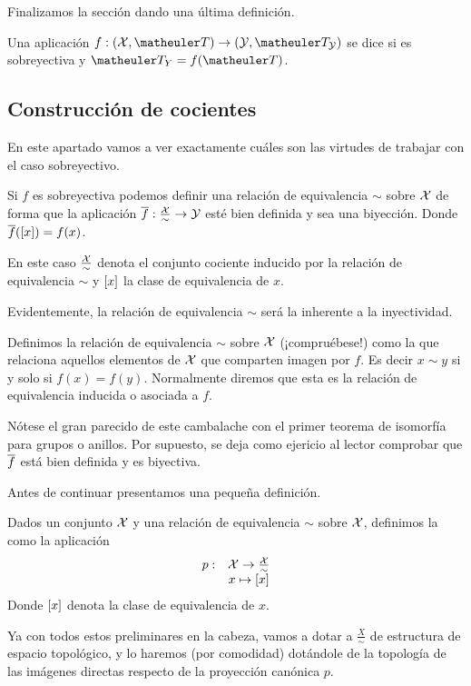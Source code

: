 Finalizamos la sección dando una última definición.
\begin{defi}[Indentificación]
	Una aplicación $f:(\X,\T)\to(\Y,\T_\Y)$ se dice  si es sobreyectiva y $\T_Y=f(\T)$.
\end{defi}
\subsection{Construcción de cocientes}
En este apartado vamos a ver exactamente cuáles son las virtudes de trabajar con el caso sobreyectivo.

Si $f$ es sobreyectiva podemos definir una relación de equivalencia $\sim$ sobre $\mathcal{X}$ de forma que la aplicación $\overline{f}:\frac{\mathcal{X}}{\sim}\to\mathcal{Y}$ esté bien definida y sea una biyección. Donde $\overline{f}(\left [ x \right ])=f(x)$.

En este caso $\frac{\mathcal{X}}{\sim}$ denota el conjunto cociente inducido por la relación de equivalencia $\sim$ y $\left [ x \right ]$ la clase de equivalencia de $x$.

Evidentemente, la relación de equivalencia $\sim$ será la inherente a la inyectividad.
\begin{defi}
	Definimos la relación de equivalencia $\sim$ sobre $\mathcal{X}$ (¡compruébese!) como la que relaciona aquellos elementos de $\mathcal{X}$ que comparten imagen por $f$. Es decir $x\sim y$ si y solo si $f(x)=f(y)$. Normalmente diremos que esta es la relación de equivalencia inducida o asociada a $f$.
\end{defi}
Nótese el gran parecido de este cambalache con el primer teorema de isomorfía para grupos o anillos. Por supuesto, se deja como ejericio al lector comprobar que $\overline{f}$ está bien definida y es biyectiva.

Antes de continuar presentamos una pequeña definición.
\begin{defi}
	Dados un conjunto $\mathcal{X}$ y una relación de equivalencia $\sim$ sobre $\mathcal{X}$, definimos la  como la aplicación
	\[\begin{array}{cc}
	p:&\mathcal{X}\to\frac{\mathcal{X}}{\sim}\\
	&x\mapsto\left [ x \right ]
	\end{array}\]
	Donde $\left [ x \right ]$ denota la clase de equivalencia de $x$.
\end{defi}
Ya con todos estos preliminares en la cabeza, vamos a dotar a $\frac{X}{\sim}$ de estructura de espacio topológico, y lo haremos (por comodidad) dotándole de la topología de las imágenes directas respecto de la proyección canónica $p$.


